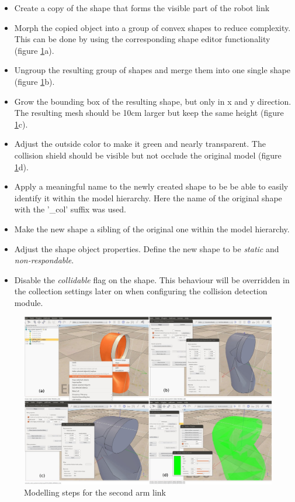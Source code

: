 \begin{itemize}

\item
Create a copy of the shape that forms the visible part of the robot link
\item
Morph the copied object into a group of convex shapes to reduce complexity. This can be done by using the corresponding shape editor functionality (figure \ref{fig:shield_steps}a).
\item
Ungroup the resulting group of shapes and merge them into one single shape (figure \ref{fig:shield_steps}b).
\item
Grow the bounding box of the resulting shape, but only in x and y direction. The resulting mesh should be 10cm larger but keep the same height (figure \ref{fig:shield_steps}c).
\item
Adjust the outside color to make it green and nearly transparent. The collision shield should be visible but not occlude the original model (figure \ref{fig:shield_steps}d).
\item
Apply a meaningful name to the newly created shape to be be able to easily identify it within the model hierarchy. Here the name of the original shape with the '\_col' suffix was used.
\item
Make the new shape a sibling of the original one within the model hierarchy.
\item
Adjust the shape object properties. Define the new shape to be \emph{static} and \emph{non-respondable}.
\item
Disable the \emph{collidable} flag on the shape. This behaviour will be overridden in the collection
settings later on when configuring the collision detection module.

\end{itemize}
\begin{figure}[hp]
	\centering
  	\includegraphics[angle=90, width=1.0\textwidth]{images/shield_steps.jpg}
	\caption{Modelling steps for the second arm link}
	\label{fig:shield_steps}
\end{figure}

